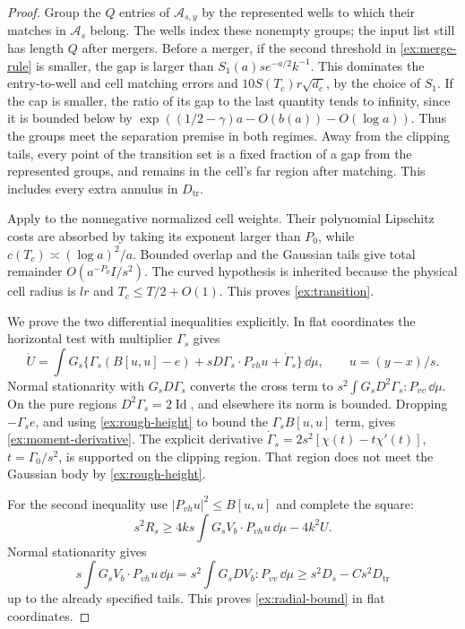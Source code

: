 \begin{proof}
Group the \(Q\) entries of \(\mathcal A_{s,y}\) by the represented
wells to which their matches in \(\mathcal A_s\) belong. The wells
index these nonempty groups; the input list still has length \(Q\)
after mergers. Before a merger, if the second threshold in
\eqref{ex:merge-rule} is smaller, the gap is larger than
\(S_1(a)s e^{-a/2}k^{-1}\). This dominates the entry-to-well and
cell matching errors and \(10S(T_c)r\sqrt{d_c}\), by the choice of
\(S_1\). If the cap is smaller, the ratio of its gap to the last
quantity tends to infinity, since it is bounded below by
\(\exp((1/2-\gamma)a-O(b(a))-O(\log a))\). Thus the groups meet
the separation premise in both regimes. Away from the clipping tails,
every point of the transition set is a fixed fraction of a gap from
the represented groups, and remains in the cell's far region after
matching. This includes every extra annulus in \(D_{\mathrm{tr}}\).

Apply  to the nonnegative normalized cell weights.
Their polynomial Lipschitz costs are absorbed by taking its exponent
larger than \(P_0\), while
\(c(T_c)\asymp(\log a)^2/a\). Bounded overlap and the Gaussian tails
give total remainder \(O(a^{-P_0}I/s^2)\). The curved hypothesis is
inherited because the physical cell radius is \(lr\) and
\(T_c\le T/2+O(1)\). This proves \eqref{ex:transition}.

We prove the two differential inequalities explicitly. In flat
coordinates the horizontal test with multiplier \(\Gamma_s\) gives
\[
 \dot U=\int G_s\{\Gamma_s(B[u,u]-e)
             +sD\Gamma_s\cdot P_{vh}u+\dot\Gamma_s\}\,\dd\mu,
 \qquad u=(y-x)/s.
\]
Normal stationarity with \(G_sD\Gamma_s\) converts the cross term
to \(s^2\int G_sD^2\Gamma_s:P_{vv}\,\dd\mu\).
On the pure regions \(D^2\Gamma_s=2\operatorname{Id}\), and
elsewhere its norm is bounded. Dropping \(-\Gamma_se\), and using
\eqref{ex:rough-height} to bound the \(\Gamma_s B[u,u]\) term,
gives \eqref{ex:moment-derivative}. The explicit derivative
\(\dot\Gamma_s=2s^2[\chi(t)-t\chi'(t)]\),
\(t=\Gamma_0/s^2\), is supported on the clipping region. That region
does not meet the Gaussian body by \eqref{ex:rough-height}.

For the second inequality use \(|P_{vh}u|^2\le B[u,u]\) and
complete the square:
\[
 s^2R_s\ge
 4ks\int G_sV_b\cdot P_{vh}u\,\dd\mu-4k^2U.
\]
Normal stationarity gives
\[
 s\int G_sV_b\cdot P_{vh}u\,\dd\mu
   =s^2\int G_sDV_b:P_{vv}\,\dd\mu
   \ge s^2D_s-Cs^2D_{\mathrm{tr}}
\]
up to the already specified tails. This proves
\eqref{ex:radial-bound} in flat coordinates.


\end{proof}
